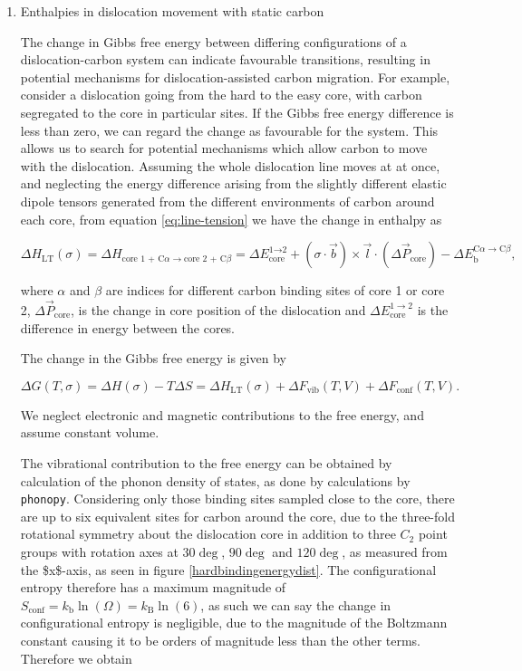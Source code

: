 \documentclass[a4paper,12pt,oneside,print,numbered,index,PageStyleIII]{PhDThesisPSnPDF}
\begin{document}
\begin{enumerate}
\item Enthalpies in dislocation movement with static carbon
\label{sec:orgbb7b1ef}

The change in Gibbs free energy between differing configurations
of a dislocation-carbon system can indicate favourable
transitions, resulting in potential mechanisms for dislocation-assisted carbon
migration. For example, consider a dislocation going from the hard
to the easy core, with carbon segregated to the core in particular
sites. If the Gibbs free energy difference is less than zero, we
can regard the change as favourable for the system. This allows us
to search for potential mechanisms which allow carbon to move with
the dislocation. Assuming the whole dislocation line moves at at
once, and neglecting the energy difference arising from the
slightly different elastic dipole tensors generated from the
different environments of carbon around each core, from equation
\ref{eq:line-tension} we have the change in enthalpy as


    \begin{equation}
\Delta H_{\text{LT} }(\sigma) =      \Delta H_{ \text{core 1 + C}\alpha \rightarrow \text{core 2 + C}\beta }
       =  \Delta E_{\text{core}}^{\text{1} \rightarrow \text{2}}
	   + (\sigma \cdot \vec{b}) \times \vec{l}  \cdot ( \Delta\vec{P}_{\text{core}} )
       - \Delta E_{\text{b}}^{\text{C}\alpha \rightarrow \text{C}\beta},
    \end{equation}

where \(\alpha\) and \(\beta\) are indices for different carbon binding sites of
core 1 or core 2, \(\Delta \vec{P}_{\text{core} }\), is the change in core
position of the dislocation and \(\Delta E^{1\rightarrow 2}_{\text{core} }\)
is the difference in energy between the cores.

The change in the Gibbs free energy is given by

\[\Delta G(T,\sigma) = \Delta H(\sigma) -
     T\Delta S =
     \Delta H_{\text{LT}}(\sigma) + \Delta F_{\text{vib} }(T,V) + \Delta F_{\text{conf} }(T,V).\]

We neglect electronic and magnetic contributions to the free energy, and assume constant volume.

The vibrational contribution to the free energy can be obtained by
calculation of the phonon density of states, as done by
calculations by \texttt{phonopy}. Considering only those binding sites sampled
close to the core, there are up to six equivalent sites for carbon around
the core, due to the three-fold rotational symmetry about the dislocation
core in addition to three \(C_2\) point groups with rotation axes at \(30\deg\), \(90\deg\)
and \(120\deg\), as measured from the \$x\$-axis, as seen in figure
\ref{hardbindingenergydist}. The configurational entropy
therefore has a maximum magnitude of \(S_{\text{conf} } =
     k_{\text{b} }\ln (\Omega) = k_{\text{B}} \ln(6)\), as such we can say the
change in configurational entropy is negligible, due to the magnitude of the
Boltzmann constant causing it to be orders of magnitude less than the other terms. Therefore we obtain


\end{enumerate}
\end{document}

